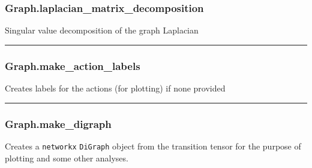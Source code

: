 \subsubsection{Graph.laplacian\_matrix\_decomposition}\label{graph.laplacian_matrix_decomposition}

\begin{Shaded}
\begin{Highlighting}[]
\NormalTok{)}
\end{Highlighting}
\end{Shaded}

Singular value decomposition of the graph Laplacian

\begin{center}\rule{0.5\linewidth}{\linethickness}\end{center}

\subsubsection{Graph.make\_action\_labels}\label{graph.make_action_labels}

\begin{Shaded}
\begin{Highlighting}[]
\NormalTok{)}
\end{Highlighting}
\end{Shaded}

Creates labels for the actions (for plotting) if none provided

\begin{center}\rule{0.5\linewidth}{\linethickness}\end{center}

\subsubsection{Graph.make\_digraph}\label{graph.make_digraph}

\begin{Shaded}
\begin{Highlighting}[]
\NormalTok{)}
\end{Highlighting}
\end{Shaded}

Creates a \texttt{networkx} \texttt{DiGraph} object from the transition
tensor for the purpose of plotting and some other analyses.

